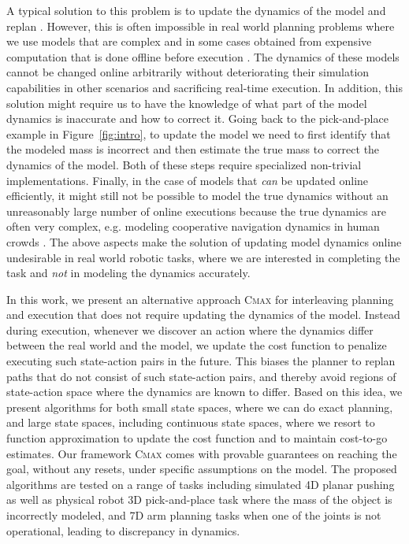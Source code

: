 A typical solution to this problem is to update the dynamics of the
model and replan \cite{DBLP:journals/sigart/Sutton91}. However, this
is often impossible in real world planning problems 
where we use models that are complex and in some cases obtained from
expensive computation that is done offline before execution
\cite{DBLP:conf/wafr/HauserBHL06}. The
dynamics of these models cannot be changed online arbitrarily without
deteriorating their simulation capabilities in other scenarios and sacrificing
real-time execution. In addition, this solution might require us to have
the knowledge of what part of the model dynamics is inaccurate and
how to correct it. Going
back to the pick-and-place example in Figure~\ref{fig:intro}, to
update the model we need to first identify
that the modeled mass is incorrect and then estimate the true mass to
correct the dynamics of the model. Both of these steps require
specialized non-trivial implementations. Finally, in the case of models that
\emph{can} be updated online efficiently, it might still not be possible to
model the true dynamics without an unreasonably large number of online
executions because the true dynamics are
often very complex, e.g. modeling cooperative navigation dynamics in
human crowds \cite{DBLP:conf/icra/VemulaMO17}. The above aspects make the 
solution of updating model dynamics online undesirable in real world robotic
tasks, where we are interested in completing the task and \emph{not} in
modeling the dynamics accurately.

In this work, we present an alternative approach \textsc{Cmax} for
interleaving planning and 
execution that does not require updating
the dynamics of the model. Instead during execution, whenever we discover an action
where the dynamics differ between the real world and the model, we
update the cost function to penalize executing such state-action pairs
in the future. This biases the planner to replan paths that do not
consist of such state-action pairs, and thereby avoid regions of
state-action space where the dynamics are known to differ. Based on
this idea, we present
algorithms for both small state spaces, where we can do
exact planning, and large state spaces, including continuous state
spaces, where we resort to function 
approximation to update the cost function and to maintain cost-to-go
estimates.
Our framework \textsc{Cmax} comes with provable guarantees on
reaching 
the goal, without any resets, under specific assumptions on
the model.
The proposed algorithms are tested on a range of tasks
including simulated 4D planar pushing as well as
physical robot 3D pick-and-place task where the mass of the object is
incorrectly modeled, and 7D arm planning tasks when one of the joints
is not operational, leading to discrepancy in dynamics. 


